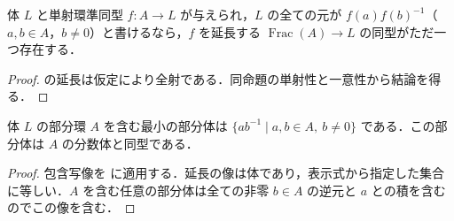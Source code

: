 \begin{prop}[分数体の特徴づけ]
体 $L$ と単射環準同型 $f:A\to L$ が与えられ，$L$ の全ての元が $f(a)f(b)^{-1}$（$a,b\in A$，$b\ne0$）と書けるなら，$f$ を延長する $\operatorname{Frac}(A)\to L$ の同型がただ一つ存在する．
\end{prop}
\begin{proof}
の延長は仮定により全射である．同命題の単射性と一意性から結論を得る．
\end{proof}
\begin{prop}[分数体と最小の部分体]
体 $L$ の部分環 $A$ を含む最小の部分体は $\{ab^{-1}\mid a,b\in A,\ b\ne0\}$ である．この部分体は $A$ の分数体と同型である．
\end{prop}
\begin{proof}
包含写像を に適用する．延長の像は体であり，表示式から指定した集合に等しい．$A$ を含む任意の部分体は全ての非零 $b\in A$ の逆元と $a$ との積を含むのでこの像を含む．
\end{proof}
